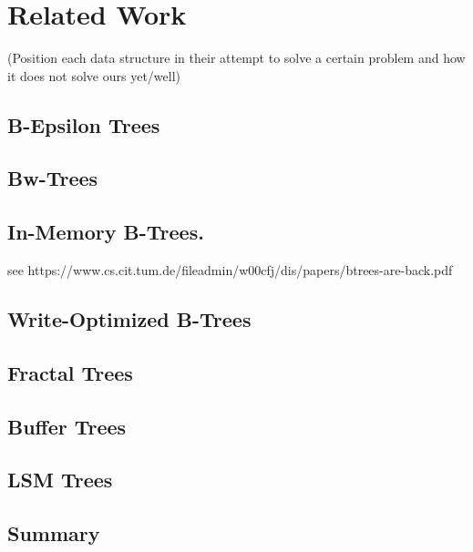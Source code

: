 \chapter{Related Work}
(Position each data structure in their attempt to solve a certain problem and how it does not solve ours yet/well)

\section{B-Epsilon Trees}
\section{Bw-Trees}
\section{In-Memory B-Trees.}
see https://www.cs.cit.tum.de/fileadmin/w00cfj/dis/papers/btrees-are-back.pdf

\section{Write-Optimized B-Trees}
\section{Fractal Trees}
\section{Buffer Trees}
\section{LSM Trees}
\section{Summary}